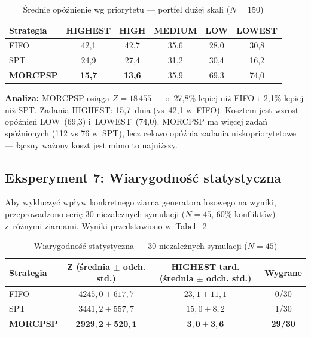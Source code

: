 \begin{table}[H]
\centering
\caption{Średnie opóźnienie wg priorytetu --- portfel dużej skali ($N=150$)}
\label{tab:exp6_tardiness}
\begin{tabular}{|l|c|c|c|c|c|}
\hline
\textbf{Strategia} & \textbf{HIGHEST} & \textbf{HIGH} & \textbf{MEDIUM} & \textbf{LOW} & \textbf{LOWEST} \\ \hline
FIFO & 42{,}1 & 42{,}7 & 35{,}6 & 28{,}0 & 30{,}8 \\ \hline
SPT & 24{,}9 & 27{,}4 & 31{,}2 & 30{,}4 & 16{,}2 \\ \hline
\textbf{MORCPSP} & \textbf{15{,}7} & \textbf{13{,}6} & 35{,}9 & 69{,}3 & 74{,}0 \\ \hline
\end{tabular}
\end{table}

\textbf{Analiza:} MORCPSP osiąga $Z = 18\,455$ --- o~27{,}8\% lepiej niż FIFO i~2{,}1\% lepiej niż SPT. Zadania HIGHEST: 15{,}7~dnia (vs~42{,}1 w~FIFO). Kosztem jest wzrost opóźnień LOW~(69{,}3) i~LOWEST~(74{,}0). MORCPSP ma więcej zadań spóźnionych (112 vs 76 w~SPT), lecz celowo opóźnia zadania niskopriorytetowe --- łączny ważony koszt jest mimo to najniższy.

\subsection{Eksperyment 7: Wiarygodność statystyczna}

Aby wykluczyć wpływ konkretnego ziarna generatora losowego na wyniki, przeprowadzono serię 30 niezależnych symulacji ($N=45$, 60\% konfliktów) z~różnymi ziarnami. Wyniki przedstawiono w~Tabeli~\ref{tab:exp7_stats}.

\begin{table}[H]
\centering
\caption{Wiarygodność statystyczna --- 30 niezależnych symulacji ($N=45$)}
\label{tab:exp7_stats}
\begin{tabular}{|l|c|c|c|}
\hline
\textbf{Strategia} & \textbf{Z (średnia $\pm$ odch. std.)} & \textbf{HIGHEST tard. (średnia $\pm$ odch. std.)} & \textbf{Wygrane} \\ \hline
FIFO & $4245{,}0 \pm 617{,}7$ & $23{,}1 \pm 11{,}1$ & 0/30 \\ \hline
SPT & $3441{,}2 \pm 557{,}7$ & $15{,}0 \pm 8{,}2$ & 1/30 \\ \hline
\textbf{MORCPSP} & $\mathbf{2929{,}2 \pm 520{,}1}$ & $\mathbf{3{,}0 \pm 3{,}6}$ & \textbf{29/30} \\ \hline
\end{tabular}
\end{table}

